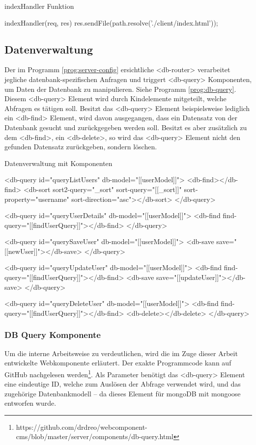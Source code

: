\begin{program}
\caption{indexHandler Funktion}
\label{prog:indexHandler}
\begin{HtmlCode}
indexHandler(req, res) {
	res.sendFile(path.resolve('./client/index.html'));
}
\end{HtmlCode}
\end{program}

\subsection{Datenverwaltung}
Der im Programm \ref{prog:server-config} ersichtliche <db-router> verarbeitet jegliche datenbank-spezifischen Anfragen und triggert <db-query> Komponenten, um Daten der Datenbank zu manipulieren. Siehe Programm \ref{prog:db-query}. Diesem <db-query> Element wird durch Kindelemente mitgeteilt, welche Abfragen es tätigen soll. Besitzt das <db-query> Element beispielsweise lediglich ein <db-find> Element, wird davon ausgegangen, dass ein Datensatz von der Datenbank gesucht und zurückgegeben werden soll. Besitzt es aber zusätzlich zu dem <db-find>, ein <db-delete>, so wird das <db-query> Element nicht den gefunden Datensatz zurückgeben, sondern löschen. 
 
\begin{program}
\caption{Datenverwaltung mit Komponenten}
\label{prog:db-query}
\begin{HtmlCode}
<db-query id="queryListUsers" db-model="[[userModel]]">
	<db-find></db-find>
	<db-sort sort2-query="{{_sort}}" sort-query="[[_sort]]" sort-property="username"
		sort-direction="asc"></db-sort>
</db-query>
	
<db-query id="queryUserDetails" db-model="[[userModel]]">
	<db-find find-query="[[findUserQuery]]"></db-find>
</db-query>
	
<db-query id="querySaveUser" db-model="[[userModel]]">
	<db-save save="[[newUser]]"></db-save>
</db-query>
	
<db-query id="queryUpdateUser" db-model="[[userModel]]">
	<db-find find-query="[[findUserQuery]]"></db-find>
	<db-save save="[[updateUser]]"></db-save>
</db-query>
	
<db-query id="queryDeleteUser" db-model="[[userModel]]">
	<db-find find-query="[[findUserQuery]]"></db-find>
	<db-delete></db-delete>
</db-query>
\end{HtmlCode}
\end{program}

\subsubsection{DB Query Komponente}
Um die interne Arbeitsweise zu verdeutlichen, wird die im Zuge dieser Arbeit entwickelte Webkomponente erläutert. Der exakte Programmcode kann auf GitHub nachgelesen werden\footnote{https://github.com/drdreo/webcomponent-cms/blob/master/server/components/db-query.html}.
Als Parameter benötigt das <db-query> Element eine eindeutige ID, welche zum Auslösen der Abfrage verwendet wird, und das zugehörige  Datenbankmodell -- da dieses Element für mongoDB mit mongoose entworfen wurde.

